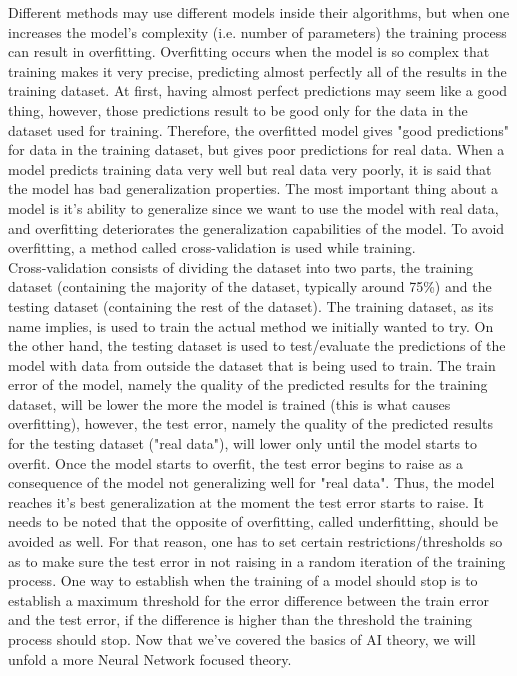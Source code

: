 Different methods may use different models inside their algorithms, but when one increases the model's complexity (i.e. number of parameters) the training process can result in overfitting. Overfitting occurs when the model is so complex that training makes it very precise, predicting almost perfectly all of the results in the training dataset. At first, having almost perfect predictions may seem like a good thing, however, those predictions result to be good only for the data in the dataset used for training. Therefore, the overfitted model gives "good predictions" for data in the training dataset, but gives poor predictions for real data. When a model predicts training data very well but real data very poorly, it is said that the model has bad generalization properties. The most important thing about a model is it's ability to generalize since we want to use the model with real data, and overfitting deteriorates the generalization capabilities of the model. To avoid overfitting, a method called cross-validation is used while training.\\

Cross-validation consists of dividing the dataset into two parts, the training dataset (containing the majority of the dataset, typically around 75\%) and the testing dataset (containing the rest of the dataset). The training dataset, as its name implies, is used to train the actual method we initially wanted to try. On the other hand, the testing dataset is used to test/evaluate the predictions of the model with data from outside the dataset that is being used to train. The train error of the model, namely the quality of the predicted results for the training dataset, will be lower the more the model is trained (this is what causes overfitting), however, the test error, namely the quality of the predicted results for the testing dataset ("real data"), will lower only until the model starts to overfit. Once the model starts to overfit, the test error begins to raise as a consequence of the model not generalizing well for "real data". Thus, the model reaches it's best generalization at the moment the test error starts to raise. It needs to be noted that the opposite of overfitting, called underfitting, should be avoided as well. For that reason, one has to set certain restrictions/thresholds so as to make sure the test error in not raising in a random iteration of the training process. One way to establish when the training of a model should stop is to establish a maximum threshold for the error difference between the train error and the test error, if the difference is higher than the threshold the training process should stop. Now that we've covered the basics of AI theory, we will unfold a more Neural Network focused theory.\\ %


